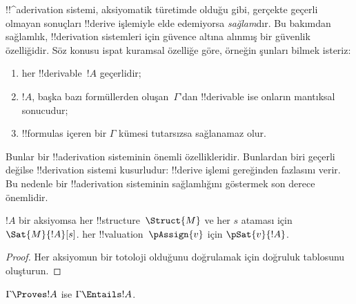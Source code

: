 \documentclass[../../../include/open-logic-section]{subfiles}
\begin{document}
      {}
      {}


\begin{explain}
!!^a{derivation} sistemi, aksiyomatik türetimde olduğu gibi, gerçekte geçerli
olmayan sonuçları !!{derive} işlemiyle elde edemiyorsa \emph{sağlam}dır. Bu
bakımdan sağlamlık, !!{derivation} sistemleri için güvence altına alınmış bir
güvenlik özelliğidir. Söz konusu ispat kuramsal özelliğe göre, örneğin şunları
bilmek isteriz:
\begin{enumerate}
\item her !!{derivable}~$!A$ geçerlidir;
\item $!A$, başka bazı formüllerden oluşan~$\Gamma$'dan !!{derivable} ise onların
  mantıksal sonucudur;
\item !!{formula}s içeren bir $\Gamma$ kümesi tutarsızsa sağlanamaz olur.
\end{enumerate}
Bunlar bir !!a{derivation} sisteminin önemli özellikleridir. Bunlardan biri
geçerli değilse !!{derivation} sistemi kusurludur: !!{derive} işlemi
gereğinden fazlasını verir. Bu nedenle bir !!a{derivation} sisteminin sağlamlığını
göstermek son derece önemlidir.
\end{explain}

\begin{prop}
  $!A$ bir aksiyomsa
    {her !!{structure}~$\Struct{M}$ ve her $s$ ataması için
    $\Sat{M}{!A}[s]$.}
    {her !!{valuation}~$\pAssign{v}$ için $\pSat{v}{!A}$.}
\end{prop}

\begin{proof}
  {Her aksiyomun bir totoloji olduğunu doğrulamak için doğruluk tablosunu
  oluşturun.}
\end{proof}

\begin{thm}[Sağlamlık]
$\Gamma \Proves !A$ ise $\Gamma \Entails !A$.
\end{thm}
\end{document}
